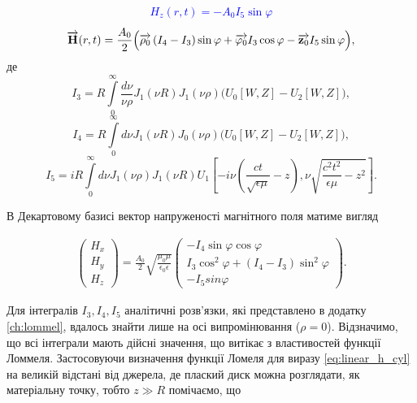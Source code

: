 %
\textcolor{blue} { \begin{equation*} \begin{aligned}
H_z \left( r, t \right) = - A_0 I_5 \sin \varphi
\end{aligned} \end{equation*} }
%
\begin{equation} \label{eq:linear_h_cyl}
\overrightarrow{\mathbf H} (r, t) = \frac{A_0}{2} \Big( 
\overrightarrow{\mathbf \rho_0} \left( I_4 - I_3 \right) \sin \varphi +
\overrightarrow{\mathbf \varphi_0} I_3 \cos \varphi -
\overrightarrow{\mathbf z_0} I_5 \sin \varphi \Big),
\end{equation}
%
де 
%
\begin{equation*}
I_3 = R \int \limits_{0}^{\infty}
\frac{d\nu}{\nu \rho} J_1(\nu R) J_1(\nu \rho)
\Big( U_0[ W, Z ] - U_2[ W, Z ] \Big),
\end{equation*}
%
\begin{equation*}
I_4 = R \int \limits_{0}^{\infty} d\nu J_1(\nu R) J_0(\nu \rho)
\Big( U_0[ W, Z ] - U_2[ W, Z ] \Big),
\end{equation*}
%
\begin{equation*}
I_5 = i R \int \limits_0^\infty 
d \nu J_1(\nu \rho) J_1 (\nu R)
U_1 \left[ -i \nu \left( \frac{ct}{\sqrt{\epsilon \mu}} - z \right), 
\nu \sqrt{\frac{c^2t^2}{\epsilon \mu}-z^2} \right].
\end{equation*}

В Декартовому базисі вектор напруженості магнітного поля матиме вигляд

\begin{equation} \begin{aligned} \label{eq:Hxyz}
\left( \begin{array}{c} H_x \\ H_y \\ H_z \end{array} \right) = 
\frac{A_0}{2} \sqrt{\frac{\mu_0 \mu}{\epsilon_0 \epsilon}} 
\left( \begin{array}{c}
- I_4 \sin \varphi \cos \varphi \\
I_3 \cos^2 \varphi + (I_4 - I_3) \sin^2 \varphi \\
- I_5 sin \varphi
\end{array} \right).
\end{aligned} \end{equation}

Для інтегралів $ I_3, I_4, I_5 $ аналітичні розв'язки, які представлено в 
додатку \ref{ch:lommel}, вдалось знайти лише на осі випромінювання 
($ \rho = 0 $). Відзначимо, що всі інтеграли мають дійсні значення, що витікає
з властивостей функції Ломмеля. Застосовуючи визначення функції Ломеля для  
виразу \eqref{eq:linear_h_cyl} на великій відстані від джерела, де плаский 
диск можна розглядати, як матеріальну точку, тобто $ z \gg R $ помічаємо, що 

